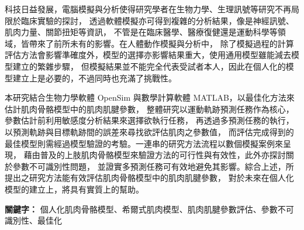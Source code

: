 \begin{abstractCH}
\fontsize{12pt}{18pt}\selectfont

科技日益發展，電腦模擬與分析使得研究學者在生物力學、生理訊號等研究不再局限於臨床實驗的探討，
透過軟體模擬亦可得到複雜的分析結果，像是神經訊號、肌肉力量、關節扭矩等資訊，
不管是在臨床醫學、醫療復健還是運動科學等領域，皆帶來了前所未有的影響。在人體動作模擬與分析中，
除了模擬過程的計算評估方法會影響準確度外，模型的選擇亦影響結果重大，使用通用模型雖能減去模型建立的繁雜步驟，
但模擬結果並不能完全代表受試者本人，因此在個人化的模型建立上是必要的，不過同時也充滿了挑戰性。

本研究結合生物力學軟體 OpenSim 與數學計算軟體 MATLAB，以最佳化方法來估計肌肉骨骼模型中的肌肉肌腱參數，
整體研究以運動軌跡預測任務作為核心，參數估計前利用敏感度分析結果來選擇欲執行任務，
再透過多預測任務的執行，以預測軌跡與目標軌跡間的誤差來尋找欲評估肌肉之參數值，
而評估完成得到的最佳模型則需經過模型驗證的考驗。一連串的研究方法流程以數個模擬案例來呈現，
藉由普及的上肢肌肉骨骼模型來驗證方法的可行性與有效性，此外亦探討關於參數不可識別性問題，
並證實多預測任務可有效地避免其影響。綜合上述，所提出之研究方法能有效評估肌肉骨骼模型中的肌肉肌腱參數，
對於未來在個人化模型的建立上，將具有實質上的幫助。

\bigskip
\textbf{關鍵字：} 個人化肌肉骨骼模型、希爾式肌肉模型、肌肉肌腱參數評估、參數不可識別性、最佳化

\end{abstractCH}